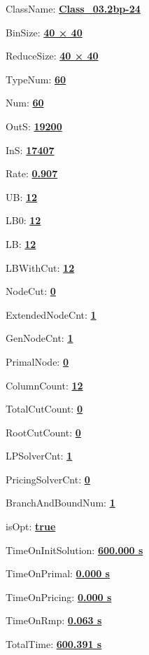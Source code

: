 \documentclass[11pt]{article}
\begin{document}
\pagestyle{empty}


ClassName: \underline{\textbf{Class_03.2bp-24}}
\par
BinSize: \underline{\textbf{40 × 40}}
\par
ReduceSize: \underline{\textbf{40 × 40}}
\par
TypeNum: \underline{\textbf{60}}
\par
Num: \underline{\textbf{60}}
\par
OutS: \underline{\textbf{19200}}
\par
InS: \underline{\textbf{17407}}
\par
Rate: \underline{\textbf{0.907}}
\par
UB: \underline{\textbf{12}}
\par
LB0: \underline{\textbf{12}}
\par
LB: \underline{\textbf{12}}
\par
LBWithCut: \underline{\textbf{12}}
\par
NodeCut: \underline{\textbf{0}}
\par
ExtendedNodeCnt: \underline{\textbf{1}}
\par
GenNodeCnt: \underline{\textbf{1}}
\par
PrimalNode: \underline{\textbf{0}}
\par
ColumnCount: \underline{\textbf{12}}
\par
TotalCutCount: \underline{\textbf{0}}
\par
RootCutCount: \underline{\textbf{0}}
\par
LPSolverCnt: \underline{\textbf{1}}
\par
PricingSolverCnt: \underline{\textbf{0}}
\par
BranchAndBoundNum: \underline{\textbf{1}}
\par
isOpt: \underline{\textbf{true}}
\par
TimeOnInitSolution: \underline{\textbf{600.000 s}}
\par
TimeOnPrimal: \underline{\textbf{0.000 s}}
\par
TimeOnPricing: \underline{\textbf{0.000 s}}
\par
TimeOnRmp: \underline{\textbf{0.063 s}}
\par
TotalTime: \underline{\textbf{600.391 s}}
\par
\newpage


\end{document}
